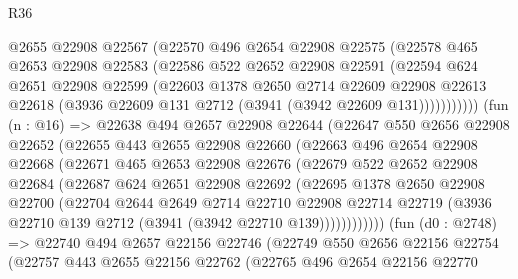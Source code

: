 \begin{lexlean}{R36}
\begin{coremodule}
              @2655
              @22908
              @22567
              (@22570
                @496
                @2654
                @22908
                @22575
                (@22578
                  @465
                  @2653
                  @22908
                  @22583
                  (@22586
                    @522
                    @2652
                    @22908
                    @22591
                    (@22594
                      @624
                      @2651
                      @22908
                      @22599
                      (@22603
                        @1378
                        @2650
                        @2714
                        @22609
                        @22908
                        @22613
                        @22618
                        (@3936 @22609 @131 @2712 (@3941 (@3942 @22609 @131)))))))))))
        (fun (n : @16) =>
        @22638
          @494
          @2657
          @22908
          @22644
          (@22647
            @550
            @2656
            @22908
            @22652
            (@22655
              @443
              @2655
              @22908
              @22660
              (@22663
                @496
                @2654
                @22908
                @22668
                (@22671
                  @465
                  @2653
                  @22908
                  @22676
                  (@22679
                    @522
                    @2652
                    @22908
                    @22684
                    (@22687
                      @624
                      @2651
                      @22908
                      @22692
                      (@22695
                        @1378
                        @2650
                        @22908
                        @22700
                        (@22704
                          @2644
                          @2649
                          @2714
                          @22710
                          @22908
                          @22714
                          @22719
                          (@3936 @22710 @139 @2712 (@3941 (@3942 @22710 @139))))))))))))
        (fun (d0 : @2748) =>
        @22740
          @494
          @2657
          @22156
          @22746
          (@22749
            @550
            @2656
            @22156
            @22754
            (@22757
              @443
              @2655
              @22156
              @22762
              (@22765
                @496
                @2654
                @22156
                @22770

\end{coremodule}
\end{lexlean}
